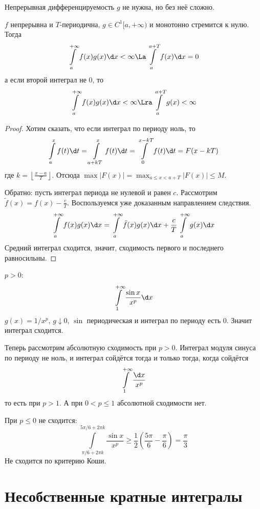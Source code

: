 \begin{Rem}
	Непрерывная дифференцируемость $g$ не нужна, но без неё сложно.
\end{Rem}

\begin{conseq}
	$f$ непрерывна и $T$-периодична, $g \in C^1[a, +\infty)$ и монотонно стремится к нулю.
	Тогда
	\[ \int\limits_a^{+\infty} f(x) g(x) \d x < \infty \La \int\limits_a^{a+T} f(x) \d x = 0 \]
	а если второй интеграл не 0, то
	\[ \int\limits_a^{+\infty} f(x) g(x) \d x < \infty \Lra \int\limits_a^{a+T} g(x) < \infty \]
\end{conseq}

\begin{proof}
	Хотим сказать, что если интеграл по периоду ноль, то
	\[ \int\limits_a^x f(t) \d t = \int\limits_{a+kT}^x f(t) \d t = \int\limits_0^{x-kT} f(t) \d t = F(x - kT) \]
	где $k = \left\lfloor \frac{x - a}T \right\rfloor$.
	Отсюда $\max |F(x)| = \max_{a \le x < a + T} |F(x)| \le M$.

	Обратно: пусть интеграл периода не нулевой и равен $c$.
	Рассмотрим $\tilde f(x) = f(x) - \frac{c}T$.
	Воспользуемся уже доказанным направлением следствия.
	\[ \int\limits_a^{+\infty} f(x) g(x) \d x = \int\limits_a^{+\infty} \tilde f(x) g(x) \d x + \frac{c}T \int\limits_a^{+\infty} g(x) \d x \]
	Средний интеграл сходится, значит, сходимость первого и последнего равносильны.
\end{proof}

\begin{exmp}\label{exmpIntFracSin}
	$p > 0$:
	\[ \int\limits_1^{+\infty} \frac{\sin x}{x^p} \d x \]
	$g(x) = 1 / x^p$, $g \downarrow 0$, $\sin$ периодическая и интеграл по периоду есть 0.
	Значит интеграл сходится.

	Теперь рассмотрим абсолютную сходимость при $p>0$.
	Интеграл модуля синуса по периоду не ноль, и интеграл сойдётся тогда и только тогда, когда сойдётся
	\[ \int\limits_1^{+\infty} \frac{\d x}{x^p} \]
	то есть при $p > 1$.
	А при $0 < p \le 1$ абсолютной сходимости нет.

	При $p \le 0$ не сходится:
	\[ \int\limits_{\pi/6+2\pi k}^{5 \pi/6 + 2\pi k} \frac{\sin x}{x^p} \ge \frac12 \left(\frac{5\pi}6 - \frac\pi6\right) = \frac\pi3 \]
	Не сходится по критерию Коши.
\end{exmp}

\section{Несобственные кратные интегралы}

